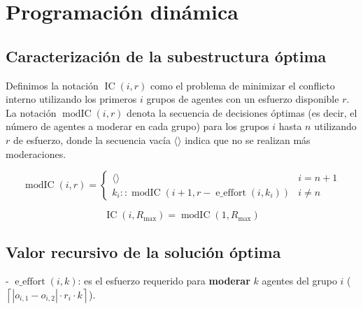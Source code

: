 




\maketitle

\tableofcontents

\newpage

\section{Programación dinámica}

\subsection{Caracterización de la subestructura óptima}

Definimos la notación $\operatorname{ IC }(i,r)$ como el problema de minimizar el conflicto interno utilizando los primeros $i$ grupos de agentes con un esfuerzo disponible $r$. La notación $\operatorname{ modIC }(i,r)$ denota la secuencia de decisiones óptimas (es decir, el número de agentes a moderar en cada grupo) para los grupos $i$ hasta $n$ utilizando $r$ de esfuerzo, donde la secuencia vacía $\langle \rangle$ indica que no se realizan más moderaciones.

\begin{equation}
	\operatorname{ modIC }(i,r) = \begin{cases}
		\langle \rangle                                                             & i = n + 1 \\
		k_i :: \operatorname{ modIC }(i + 1,r - \operatorname{ e\_effort }(i,k_i))  & i \neq n
	\end{cases}
\end{equation}

\begin{equation}
	\operatorname{ IC }(i,R_{ \max }) = \operatorname{ modIC }(1,R_{ \max })
\end{equation}

\subsection{Valor recursivo de la solución óptima}

- $\operatorname{ e\_effort }(i,k)$: es el esfuerzo requerido para \textbf{moderar} $k$ agentes del grupo $i$ ($\left \lceil |o_{ i,1 } - o_{ i,2 }| \cdot r_i \cdot k \right \rceil$).

